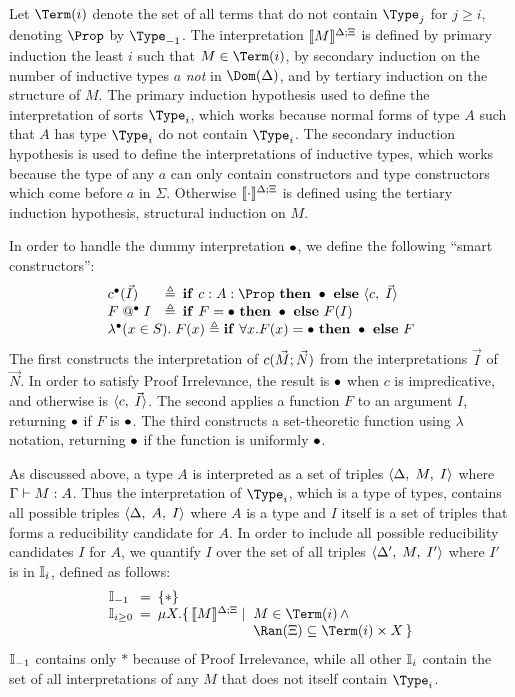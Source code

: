 \documentclass{article}
\begin{document}
Let $\Term(i)$ denote the set of all terms that do not contain
$\Type_{j}$ for $j\geq i$, denoting $\Prop$ by $\Type_{-1}$.  The
interpretation $\interp{M}$ is defined by primary induction the least
$i$ such that $M\in\Term(i)$, by secondary induction on the number of
inductive types $a$ \emph{not} in $\Dom(\Delta)$, and by tertiary
induction on the structure of $M$. The primary induction hypothesis
used to define the interpretation of sorts $\Type_i$, which works
because normal forms of type $A$ such that $A$ has type $\Type_i$ do
not contain $\Type_i$. The secondary induction hypothesis is used to
define the interpretations of inductive types, which works because the
type of any $a$ can only contain constructors and type constructors
which come before $a$ in $\Sigma$.  Otherwise $\interp{\cdot}$ is
defined using the tertiary induction hypothesis, structural induction
on $M$.

In order to handle the dummy interpretation $\dummy$, we define the
following ``smart constructors'':
\[
\begin{array}{@{}lc@{\hspace{5pt}}l@{}}
\ctorstar{c}{\vec{I}} & \triangleq & \ifthen{c:A:\Prop}{\dummy}{\pair{c}{\vec{I}}}\\
\appstar{F}{I} & \triangleq & \ifthen{F=\dummy}{\dummy}{F (I)}\\
\multicolumn{3}{@{}l@{}}{
  \lamstar{x}{S}{F(x)} \triangleq \ifthen{\forall x.F(x)=\dummy}{\dummy}{F}
}
\end{array}
\]
The first constructs the interpretation of
$\ctorapp{c}{\vec{M}}{\vec{N}}$ from the interpretations $\vec{I}$ of
$\vec{N}$. In order to satisfy Proof Irrelevance, the result is
$\dummy$ when $c$ is impredicative, and otherwise is
$\pair{c}{\vec{I}}$. The second applies a function $F$ to an argument
$I$, returning $\dummy$ if $F$ is $\dummy$.  The third constructs a
set-theoretic function using $\lambda$ notation, returning $\dummy$ if
the function is uniformly $\dummy$.


As discussed above, a type $A$ is interpreted as a set of triples
$\triple{\Delta}{M}{I}$ where $\typej{M}{A}$.  Thus the interpretation
of $\Type_i$, which is a type of types, contains all possible triples
$\triple{\Delta}{A}{I}$ where $A$ is a type and $I$ itself is a set of
triples that forms a reducibility candidate for $A$. In order to
include all possible reducibility candidates $I$ for $A$, we
quantify $I$ over the set of all triples $\triple{\Delta'}{M}{I'}$
where $I'$ is in $\Ii$, defined as follows:
\[
\begin{array}{@{}l@{\hspace{5pt}}c@{\hspace{5pt}}l@{}}
  \Ii[-1] & = & \{*\}\\
  \Ii[i\geq 0] & = & \mu X.\setcomprarr{\interp{M}}{M\in\Term(i) \mywedge \\\Ran(\Xi)\subseteq \Term(i)\times X}
\end{array}
\]
$\Ii[-1]$ contains only $*$ because of Proof Irrelevance, while all
other $\Ii$ contain the set of all interpretations of any $M$ that
does not itself contain $\Type_i$.
\end{document}
